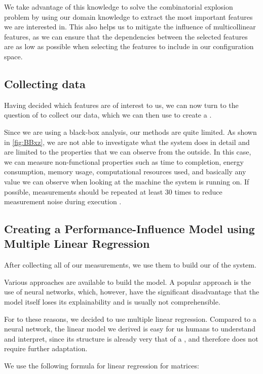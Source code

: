 We take advantage of this knowledge to solve the combinatorial explosion problem by using our domain knowledge to extract the most important
features we are interested in. This also helps us to mitigate the influence of multicollinear features, as we can ensure that the dependencies 
between the selected features are as low as possible when selecting the features to include in our configuration space.

\subsection{Collecting data}
Having decided which features are of interest to us, we can now turn to the question of to collect our data,
which we can then use to create a \perfInfluenceModel.

Since we are using a black-box analysis, our methods are quite limited. As shown in \autoref{fig:BBxz}, we are not able to investigate what the system does 
in detail and are limited to the properties that we can observe from the outside. 
In this case, we can measure non-functional properties such as time to completion, energy consumption, memory usage, 
computational resources used, and basically any value we can observe when looking at the machine the system is running on. 
If possible, measurements should be repeated at least 30 times to reduce measurement noise during execution \cite{SampleSize}.


\subsection{Creating a Performance-Influence Model using Multiple Linear Regression}
After collecting all of our measurements, we use them to build our \perfInfluenceModel of the system. 

Various approaches are available to build the model.
A popular approach is the use of neural networks, which, however, 
have the significant disadvantage that the model itself loses its explainability and is usually not comprehensible.

For to these reasons, we decided to use multiple linear regression. Compared to a neural network, the linear model we 
derived is easy for us humans to understand and interpret, since its structure is already very that of a \perfInfluenceModel,
and therefore does not require further adaptation.

We use the following formula for linear regression for matrices\cite{Linear-Regression-Performance}:

